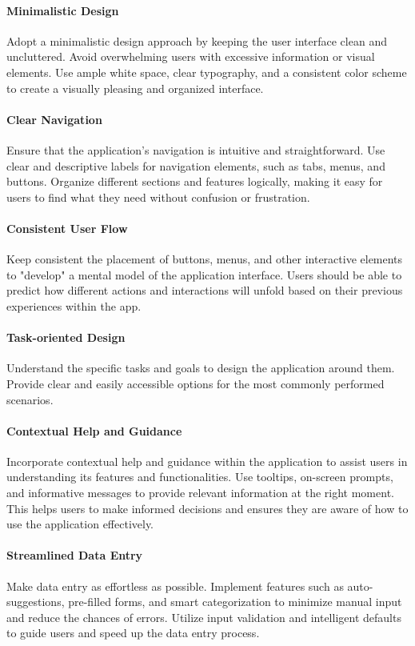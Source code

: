 \paragraph{Minimalistic Design}
Adopt a minimalistic design approach by keeping the user interface clean and uncluttered. 
Avoid overwhelming users with excessive information or visual elements. Use ample white space, clear typography, 
and a consistent color scheme to create a visually pleasing and organized interface.

\paragraph{Clear Navigation}
Ensure that the application's navigation is intuitive and straightforward. Use clear and 
descriptive labels for navigation elements, such as tabs, menus, and buttons. Organize different sections and 
features logically, making it easy for users to find what they need without confusion or frustration.

\paragraph{Consistent User Flow}
Keep consistent the placement of buttons, menus, and other interactive elements to "develop" a mental model of 
the application interface. Users should be able to predict how different actions and interactions will unfold based 
on their previous experiences within the app. 

\paragraph{Task-oriented Design}
Understand the specific tasks and goals to design the application around them. Provide clear and easily accessible 
options for the most commonly performed scenarios.

\paragraph{Contextual Help and Guidance}
Incorporate contextual help and guidance within the application to assist users in understanding its features and 
functionalities. Use tooltips, on-screen prompts, and informative messages to provide relevant information at the 
right moment. This helps users to make informed decisions and ensures they are aware of how to use the application 
effectively.

\paragraph{Streamlined Data Entry}
Make data entry as effortless as possible. Implement features such as auto-suggestions, 
pre-filled forms, and smart categorization to minimize manual input and reduce the chances of errors. Utilize 
input validation and intelligent defaults to guide users and speed up the data entry process.

